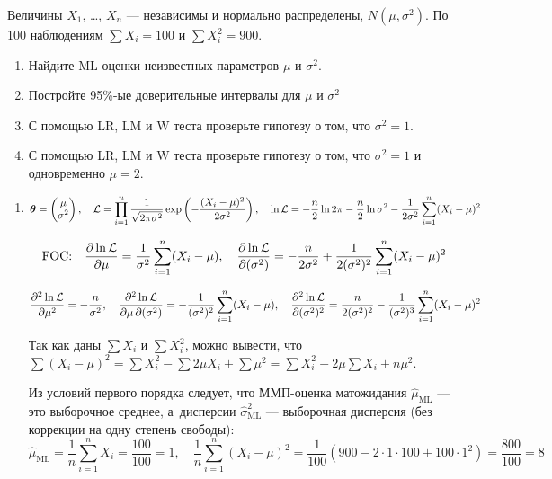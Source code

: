 \begin{problem}
Величины $X_{1}$, \ldots, $X_{n}$ — независимы и нормально распределены, $N(\mu,\sigma^2)$. По 100 наблюдениям $\sum X_i=100$ и  $\sum X_i^2=900$.
\begin{enumerate}
\item Найдите ML оценки неизвестных параметров $\mu$ и $\sigma^2$.
\item Постройте 95\%-ые доверительные интервалы для $\mu$ и $\sigma^2$
\item С помощью LR, LM и W теста проверьте гипотезу о том, что $\sigma^2=1$.
\item С помощью LR, LM и W теста проверьте гипотезу о том, что $\sigma^2=1$ и одновременно $\mu=2$.
\end{enumerate}


\begin{sol}
  \begin{enumerate}
  \item
\[
\boldsymbol{\theta} =
\begin{pmatrix} \mu \\ \sigma^2 \end{pmatrix}, \quad
\mathcal{L} = \prod_{i=1}^n \frac{1}{\sqrt{2\pi\sigma^2}} \exp \left( -\frac{(X_i-\mu)^2}{2\sigma^2} \right), \quad
\ln \mathcal{L} = -\frac{n}{2}\ln 2\pi - \frac{n}{2} \ln \sigma^2 - \frac{1}{2\sigma^2} \sum\limits_{i=1}^n (X_i-\mu)^2
\]

\[
\text{FOC:} \quad
\frac{\partial \ln \mathcal{L}}{\partial \mu} = \frac{1}{\sigma^2} \sum\limits_{i=1}^n (X_i-\mu), \quad \frac{\partial \ln \mathcal{L}}{\partial (\sigma^2)} = -\frac{n}{2\sigma^2} + \frac{1}{2(\sigma^2)^2} \sum\limits_{i=1}^n (X_i-\mu)^2
\]

\[
\frac{\partial^2 \ln \mathcal{L}}{\partial \mu^2} = -\frac{n}{\sigma^2}, \quad \frac{\partial^2 \ln \mathcal{L}}{\partial \mu \, \partial (\sigma^2)} = -\frac{1}{(\sigma^2)^2} \sum\limits_{i=1}^n (X_i - \mu), \quad \frac{\partial^2 \ln \mathcal{L}}{\partial (\sigma^2)^2} = \frac{n}{2(\sigma^2)^2} - \frac{1}{(\sigma^2)^3} \sum\limits_{i=1}^n (X_i - \mu)^2
\]

Так как даны $\sum X_i$ и $\sum X_i^2$, можно вывести, что $\sum(X_i - \mu)^2 = \sum X_i^2 - \sum 2\mu X_i + \sum \mu^2 = \sum X_i^2 - 2\mu \sum X_i + n \mu^2$.

Из условий первого порядка следует, что ММП-оценка матожидания $\hat\mu_{\text{ML}}$ — это выборочное среднее, а~дисперсии $\hat\sigma^2_{\text{ML}}$ — выборочная дисперсия (без коррекции на одну степень свободы):
\[
\hat \mu_{\text{ML}} = \frac1n \sum\limits_{i=1}^n X_i = \frac{100}{100} = 1, \quad \frac{1}{n}\sum\limits_{i=1}^n (X_i - \mu)^2  = \frac{1}{100}(900 - 2\cdot 1 \cdot 100 + 100\cdot 1^2) = \frac{800}{100} = 8
\]


\end{enumerate}
\end{sol}
\end{problem}
